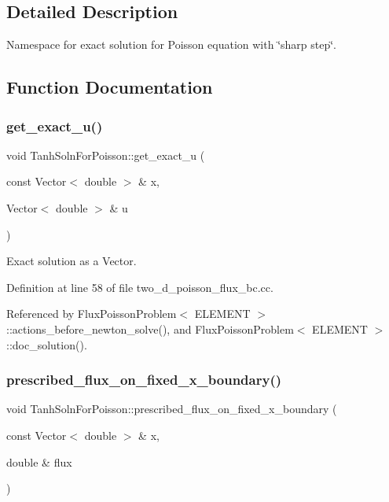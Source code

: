 \subsection{Detailed Description}
Namespace for exact solution for Poisson equation with \char`\"{}sharp step\char`\"{}. 

\subsection{Function Documentation}
\mbox{\label{namespaceTanhSolnForPoisson_af7896e9c18ce6438c73ae2a875e8b7de}} 
\subsubsection{\texorpdfstring{get\+\_\+exact\+\_\+u()}{get\_exact\_u()}}
{\footnotesize\ttfamily void Tanh\+Soln\+For\+Poisson\+::get\+\_\+exact\+\_\+u (\begin{DoxyParamCaption}\item[{const Vector$<$ double $>$ \&}]{x,  }\item[{Vector$<$ double $>$ \&}]{u }\end{DoxyParamCaption})}



Exact solution as a Vector. 



Definition at line 58 of file two\+\_\+d\+\_\+poisson\+\_\+flux\+\_\+bc.\+cc.



Referenced by Flux\+Poisson\+Problem$<$ E\+L\+E\+M\+E\+N\+T $>$\+::actions\+\_\+before\+\_\+newton\+\_\+solve(), and Flux\+Poisson\+Problem$<$ E\+L\+E\+M\+E\+N\+T $>$\+::doc\+\_\+solution().

\mbox{\label{namespaceTanhSolnForPoisson_a0e99ccf27df36f28f091de6d57484172}} 
\subsubsection{\texorpdfstring{prescribed\+\_\+flux\+\_\+on\+\_\+fixed\+\_\+x\+\_\+boundary()}{prescribed\_flux\_on\_fixed\_x\_boundary()}}
{\footnotesize\ttfamily void Tanh\+Soln\+For\+Poisson\+::prescribed\+\_\+flux\+\_\+on\+\_\+fixed\+\_\+x\+\_\+boundary (\begin{DoxyParamCaption}\item[{const Vector$<$ double $>$ \&}]{x,  }\item[{double \&}]{flux }\end{DoxyParamCaption})}



